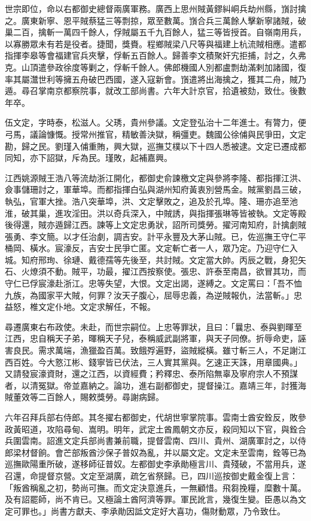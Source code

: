 \begin{pinyinscope}
世宗即位，命以右都御史總督兩廣軍務。廣西上思州賊黃鏐糾峒兵劫州縣，嵿討擒之。廣東新寧、恩平賊蔡猛三等剽掠，眾至數萬。嵿合兵三萬餘人擊新寧諸賊，破巢二百，擒斬一萬四千餘人，俘賊屬五千九百餘人，猛三等皆授首。自嶺南用兵，以寡勝眾未有若是役者。捷聞，獎賚。程鄉賊梁八尺等與福建上杭流賊相應。遣都指揮李皋等會福建官兵夾擊，俘斬五百餘人。歸善李文積聚奸宄拒捕，討之，久弗克。山頂遣參政徐度等剿之，俘斬千餘人。佛郎機國人別都盧剽劫滿剌加諸國，復率其屬灊世利等擁五舟破巴西國，遂入寇新會。嵿遣將出海擒之，獲其二舟，賊乃遁。尋召掌南京都察院事，就改工部尚書。六年大計京官，拾遺被劾，致仕。後數年卒。

伍文定，字時泰，松滋人。父琇，貴州參議。文定登弘治十二年進士。有膂力，便弓馬，議論慷慨。授常州推官，精敏善決獄，稱彊吏。魏國公徐俌與民爭田，文定勘，歸之民。劉瑾入俌重賄，興大獄，巡撫艾樸以下十四人悉被逮。文定已遷成都同知，亦下詔獄，斥為民。瑾敗，起補嘉興。

江西姚源賊王浩八等流劫浙江開化，都御史俞諫檄文定與參將李隆、都指揮江洪、僉事儲珊討之，軍華埠。而都指揮白弘與湖州知府黃衷別營馬金。賊黨劉昌三破，執弘，官軍大挫。浩八突華埠，洪、文定擊敗之，追及於孔埠。隆、珊亦追至池淮，破其巢，進攻淫田。洪以奇兵深入，中賊誘，與指揮張琳等皆被執。文定等殿後得還，賊亦遁歸江西。諫等上文定忠勇狀，詔所司獎勞。擢河南知府，計擒劇賊張勇、李文簡。以才任治劇，調吉安。計平永豐及大茅山賊。已，佐巡撫王守仁平桶岡、橫水。宸濠反，吉安士民爭亡匿。文定斬亡者一人，眾乃定。乃迎守仁入城。知府邢珣、徐璉、戴德孺等先後至，共討賊。文定當大帥。丙辰之戰，身犯矢石、火燎須不動。賊平，功最，擢江西按察使。張忠、許泰至南昌，欲冒其功，而守仁已俘宸濠赴浙江。忠等失望，大恨。文定出謁，遂縛之。文定罵曰：「吾不恤九族，為國家平大賊，何罪？汝天子腹心，屈辱忠義，為逆賊報仇，法當斬。」忠益怒，椎文定仆地。文定求解任，不報。

尋遷廣東右布政使。未赴，而世宗嗣位。上忠等罪狀，且曰：「曩忠、泰與劉暉至江西，忠自稱天子弟，暉稱天子兒，泰稱威武副將軍，與天子同僚。折辱命吏，誣害良民。需求萬端，漁獵盈百萬。致餓殍遍野，盜賊縱橫。雖寸斬三人，不足謝江西百姓。今大憝江彬、錢寧皆已伏法，三人實其黨與。乞速正天誅，用章國典。」又請發宸濠資財，還之江西，以資經費；矜釋忠、泰所陷無辜及寧府宗人不預謀者，以清冤獄。帝並嘉納之。論功，進右副都御史，提督操江。嘉靖三年，討獲海賊董效等二百餘人，賜敕獎勞。尋謝病歸。

六年召拜兵部右侍郎。其冬擢右都御史，代胡世寧掌院事。雲南士酋安銓反，敗參政黃昭道，攻陷尋甸、嵩明。明年，武定土酋鳳朝文亦反，殺同知以下官，與銓合兵圍雲南。詔進文定兵部尚書兼前職，提督雲南、四川、貴州、湖廣軍討之，以侍郎梁材督餉。會芒部叛酋沙保子普奴為亂，并以屬文定。文定未至雲南，銓等已為巡撫歐陽重所破，遂移師征普奴。左都御史李承勛極言川、貴殘破，不當用兵，遂召還，命提督京營。文定至湖廣，疏乞省祭歸。已，四川巡按御史戴金復上言：「叛酋稱亂之初，勢尚可撫。而文定決意進兵，一無顧惜。飛芻挽糧，糜數十萬。及有詔罷師，尚不肯已。又極論土酋阿濟等罪。軍民訛言，幾復生變。臣愚以為文定可罪也。」尚書方獻夫、李承勛因詆文定好大喜功，傷財動眾，乃令致仕。


\end{pinyinscope}
